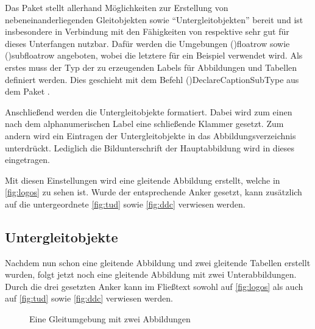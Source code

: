 \documentclass[%
  english,ngerman,%
  cdgeometry=no,DIV=12,%
  cd=false,cdfont=false,cdtitle=true,%
  headings=normal,%
  automark,%
  listof=toc,%
]{tudscrartcl}
\begin{document}
Das Paket  stellt allerhand Möglichkeiten zur Erstellung von 
nebeneinanderliegenden Gleitobjekten sowie \enquote{Untergleitobjekten} bereit 
und ist insbesondere in Verbindung mit den Fähigkeiten von  
respektive  sehr gut für dieses Unterfangen nutzbar. Dafür 
werden die Umgebungen \Environment(){floatrow} sowie 
\Environment(){subfloatrow} angeboten, wobei die letztere für 
ein Beispiel verwendet wird. Als erstes muss der Typ der zu erzeugenden Labels 
für Abbildungen und Tabellen definiert werden. Dies geschieht mit dem Befehl 
\Macro(){DeclareCaptionSubType} aus dem Paket 
.
%
\begin{Preamble}
\end{Preamble}
%
Anschließend werden die Untergleitobjekte formatiert. Dabei wird zum einen nach 
dem alphanumerischen Label eine schließende Klammer gesetzt. Zum andern wird 
ein Eintragen der Untergleitobjekte in das Abbildungsverzeichnis unterdrückt. 
Lediglich die Bildunterschrift der Hauptabbildung wird in dieses eingetragen.
%
\begin{Preamble*}
\captionsetup[subfloat]{labelformat=brace,list=off}

\end{Preamble*}
%
Mit diesen Einstellungen wird eine gleitende Abbildung erstellt, welche in 
\autoref{fig:logos} zu sehen ist. Wurde der entsprechende Anker gesetzt, kann 
zusätzlich auf die untergeordnete \autoref{fig:tud} sowie \autoref{fig:ddc} 
verwiesen werden.
%
\begin{Trunk+}
\subsection{Untergleitobjekte}

Nachdem nun schon eine gleitende Abbildung und zwei gleitende Tabellen 
erstellt wurden, folgt jetzt noch eine gleitende Abbildung mit zwei 
Unterabbildungen. Durch die drei gesetzten Anker kann im Fließtext 
sowohl auf \autoref{fig:logos} als auch auf \autoref{fig:tud} sowie 
\autoref{fig:ddc} verwiesen werden.

\end{Trunk+}
\begin{Trunk}
\begin{figure}
%
  {\caption{Eine Gleitumgebung mit zwei Abbildungen\label{fig:logos}}}%
\end{figure}

\end{Trunk}
\InputCode
\end{document}
